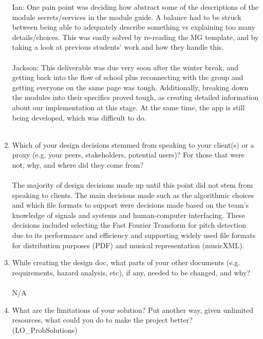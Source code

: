 \documentclass[12pt, titlepage]{article}
\begin{document}
\begin{enumerate}
    Ian:  One pain point was deciding how abstract some of the descriptions of the module secrets/services in the module guide. A balance had to be struck between being able to adequately describe something vs explaining too many details/choices. This was easily solved by re-reading the MG template, and by taking a look at previous students’ work and how they handle this. \\ \\

    Jackson: This deliverable was due very soon after the winter break, and getting back into the flow of school plus reconnecting with the group and getting everyone on the same page was tough. Additionally, breaking down the modules into their specifics proved tough, as creating detailed information about our implementation at this stage. At the same time, the app is still being developed, which was difficult to do. \\ \\

    
  \item Which of your design decisions stemmed from speaking to your client(s)
  or a proxy (e.g. your peers, stakeholders, potential users)? For those that
  were not, why, and where did they come from? \\ \\

  The majority of design decisions made up until this point did not stem from speaking to clients. The main decisions made such as the algorithmic choices and which file formats to support were decisions made based on the team’s knowledge of signals and systems and human-computer interfacing. These decisions included selecting the Fast Fourier Transform for pitch detection due to its performance and efficiency and supporting widely used file formats for distribution purposes (PDF) and musical representation (musicXML).

  \item While creating the design doc, what parts of your other documents (e.g.
  requirements, hazard analysis, etc), if any, needed to be changed, and why? \\ \\

  N/A \\
  \item What are the limitations of your solution?  Put another way, given
  unlimited resources, what could you do to make the project better? (LO\_ProbSolutions) \\ \\


\end{enumerate}
\end{document}
